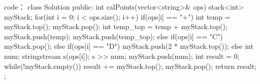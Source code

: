 code：
class Solution {
public:
    int calPoints(vector<string>& ops) {
        stack<int> myStack;
        for(int i = 0; i < ops.size(); i++)
        {
            if(ops[i] == "+")
            {
                int temp = myStack.top();
                myStack.pop();
                int temp_top = temp + myStack.top();
                myStack.push(temp);
                myStack.push(temp_top);
            }
            else if(ops[i] == "C")
            {
                myStack.pop();
            }
            else if(ops[i] == "D")
            {
                myStack.push(2 * myStack.top());
            }
            else
            {
                int num;
                stringstream s(ops[i]);
                s >> num;
                myStack.push(num);
            }
        }
        int result = 0;
        while(!myStack.empty())
        {
            result += myStack.top();
            myStack.pop();
        }
        return result;
    }
};